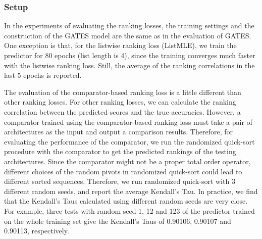 \documentclass[runningheads]{llncs}
\begin{document}
\subsubsection{Setup}


In the experiments of evaluating the ranking losses, the training settings and the construction of the GATES model are the same as in the evaluation of GATES. 
One exception is that, for the listwise ranking loss (ListMLE), we train the predictor for 80 epochs (list length is 4), since the training converges much faster with the listwise ranking loss. Still, the average of the ranking correlations in the last 5 epochs is reported.

The evaluation of the comparator-based ranking loss is a little different than other ranking losses. For other ranking losses, we can calculate the ranking correlation between the predicted scores  and the true accuracies. However, a comparator trained using the comparator-based ranking loss must take a pair of architectures as the input and output a comparison results. Therefore, for evaluating the performance of the comparator,
we run the randomized quick-sort procedure with the comparator to get the predicted rankings of the testing architectures. Since the comparator might not be a proper total order operator, different choices of the random pivots in randomized quick-sort could lead to different sorted sequences. Therefore, we run randomized quick-sort with 3 different random seeds, and report the average Kendall's Tau. In practice, we find that the Kendall's Taus calculated using different random seeds are very close. For example, three tests with random seed 1, 12 and 123 of the predictor trained on the whole training set give the Kendall's Taus of 0.90106, 0.90107 and 0.90113, respectively.
\end{document}
